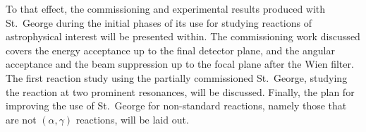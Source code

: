 To that effect, the commissioning and
experimental results produced with St.\ George during the initial phases of its
use for studying reactions of astrophysical interest will be presented within.
The commissioning work discussed covers the energy acceptance up to the final
detector plane, and the angular acceptance and the beam suppression up to the
focal plane after the Wien filter. The first reaction study using the
partially commissioned St.\ George, studying the \alpa{} reaction at two
prominent resonances, will be discussed. Finally, the plan for improving the
use of St.\ George for non-standard reactions, namely those that are not
$(\alpha,\gamma)$ reactions, will be laid out.
